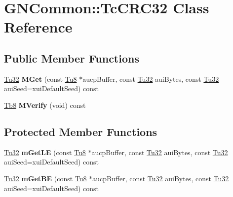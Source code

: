 \hypertarget{class_g_n_common_1_1_tc_c_r_c32}{}\section{G\+N\+Common\+:\+:Tc\+C\+R\+C32 Class Reference}
\label{class_g_n_common_1_1_tc_c_r_c32}
\subsection*{Public Member Functions}
\begin{DoxyCompactItemize}
\item 
\mbox{\label{class_g_n_common_1_1_tc_c_r_c32_a36b1cd53c1d73118b102746f482ff870}} 
\mbox{\hyperlink{namespace_g_n_common_a941b527ef318f318aed7903dc832b7e4}{Tu32}} {\bfseries M\+Get} (const \mbox{\hyperlink{namespace_g_n_common_a7939e251ddbf5d3a31832dcfdc8bde39}{Tu8}} $\ast$aucp\+Buffer, const \mbox{\hyperlink{namespace_g_n_common_a941b527ef318f318aed7903dc832b7e4}{Tu32}} aui\+Bytes, const \mbox{\hyperlink{namespace_g_n_common_a941b527ef318f318aed7903dc832b7e4}{Tu32}} aui\+Seed=xui\+Default\+Seed) const
\item 
\mbox{\label{class_g_n_common_1_1_tc_c_r_c32_a8d798a894e55e69f847392f72fc2e84d}} 
\mbox{\hyperlink{namespace_g_n_common_a8115dc7ed53b6e5b52e6bfde1632ea74}{Tb8}} {\bfseries M\+Verify} (void) const
\end{DoxyCompactItemize}
\subsection*{Protected Member Functions}
\begin{DoxyCompactItemize}
\item 
\mbox{\label{class_g_n_common_1_1_tc_c_r_c32_a49ddbc037d24f8d61766e5de26d7a362}} 
\mbox{\hyperlink{namespace_g_n_common_a941b527ef318f318aed7903dc832b7e4}{Tu32}} {\bfseries m\+Get\+LE} (const \mbox{\hyperlink{namespace_g_n_common_a7939e251ddbf5d3a31832dcfdc8bde39}{Tu8}} $\ast$aucp\+Buffer, const \mbox{\hyperlink{namespace_g_n_common_a941b527ef318f318aed7903dc832b7e4}{Tu32}} aui\+Bytes, const \mbox{\hyperlink{namespace_g_n_common_a941b527ef318f318aed7903dc832b7e4}{Tu32}} aui\+Seed=xui\+Default\+Seed) const
\item 
\mbox{\label{class_g_n_common_1_1_tc_c_r_c32_a9fc8881e9adea73851da7d4b66fb2886}} 
\mbox{\hyperlink{namespace_g_n_common_a941b527ef318f318aed7903dc832b7e4}{Tu32}} {\bfseries m\+Get\+BE} (const \mbox{\hyperlink{namespace_g_n_common_a7939e251ddbf5d3a31832dcfdc8bde39}{Tu8}} $\ast$aucp\+Buffer, const \mbox{\hyperlink{namespace_g_n_common_a941b527ef318f318aed7903dc832b7e4}{Tu32}} aui\+Bytes, const \mbox{\hyperlink{namespace_g_n_common_a941b527ef318f318aed7903dc832b7e4}{Tu32}} aui\+Seed=xui\+Default\+Seed) const
\end{DoxyCompactItemize}
